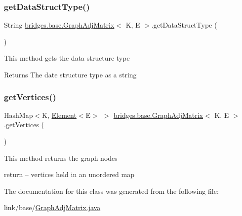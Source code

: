 \subsubsection{\texorpdfstring{get\+Data\+Struct\+Type()}{getDataStructType()}}
{\footnotesize\ttfamily String \hyperlink{classbridges_1_1base_1_1_graph_adj_matrix}{bridges.\+base.\+Graph\+Adj\+Matrix}$<$ K, E $>$.get\+Data\+Struct\+Type (\begin{DoxyParamCaption}{ }\end{DoxyParamCaption})}

This method gets the data structure type

\begin{DoxyReturn}{Returns}
The date structure type as a string 
\end{DoxyReturn}
\hypertarget{classbridges_1_1base_1_1_graph_adj_matrix_ac8270b3cbc4cf5f2f03c555ac6055423}{}\label{classbridges_1_1base_1_1_graph_adj_matrix_ac8270b3cbc4cf5f2f03c555ac6055423} 
\subsubsection{\texorpdfstring{get\+Vertices()}{getVertices()}}
{\footnotesize\ttfamily Hash\+Map$<$K, \hyperlink{classbridges_1_1base_1_1_element}{Element}$<$E$>$ $>$ \hyperlink{classbridges_1_1base_1_1_graph_adj_matrix}{bridges.\+base.\+Graph\+Adj\+Matrix}$<$ K, E $>$.get\+Vertices (\begin{DoxyParamCaption}{ }\end{DoxyParamCaption})}

This method returns the graph nodes

return -- vertices held in an unordered map 

The documentation for this class was generated from the following file\+:\begin{DoxyCompactItemize}
\item 
link/base/\hyperlink{_graph_adj_matrix_8java}{Graph\+Adj\+Matrix.\+java}\end{DoxyCompactItemize}
